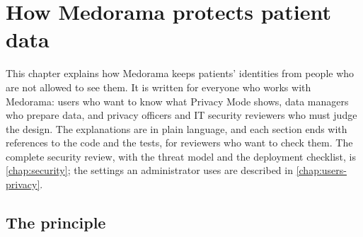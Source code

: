 \chapter{How Medorama protects patient data}
\label{chap:protecting}

This chapter explains how Medorama keeps patients' identities from people who are not allowed to
see them. It is written for everyone who works with Medorama: users who want to know what
Privacy Mode shows, data managers who prepare data, and privacy officers and IT security
reviewers who must judge the design. The explanations are in plain language, and each section
ends with references to the code and the tests, for reviewers who want to check them. The
complete security review, with the threat model and the deployment checklist, is
\cref{chap:security}; the settings an administrator uses are described in
\cref{chap:users-privacy}.

\section{The principle}
\label{sec:protecting-principle}

